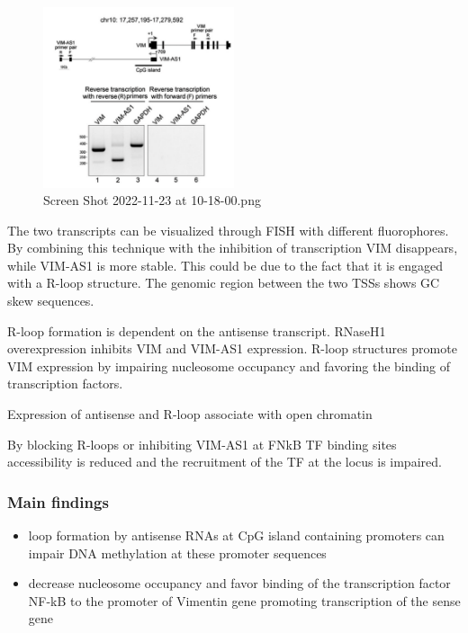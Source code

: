\begin{figure}
\centering
\includegraphics[width=0.5\textwidth]{../_resources/Screen_Shot_2022-11-23_at_10-18-00.png}
\caption{Screen Shot 2022-11-23 at 10-18-00.png}
\end{figure}

The two transcripts can be visualized through FISH with different fluorophores. By combining this technique with the inhibition of transcription VIM disappears, while VIM-AS1 is more stable. This could be due to the fact that it is engaged with a R-loop structure. The genomic region between the two TSSs shows GC skew sequences.

R-loop formation is dependent on the antisense transcript. RNaseH1 overexpression inhibits VIM and VIM-AS1 expression. R-loop structures promote VIM expression by impairing nucleosome occupancy and favoring the binding of transcription factors.

Expression of antisense and R-loop associate with open chromatin

By blocking R-loops or inhibiting VIM-AS1 at FNkB TF binding sites accessibility is reduced and the recruitment of the TF at the locus is impaired.

\hypertarget{main-findings}{%
\subsubsection{Main findings}\label{main-findings}}

\begin{itemize}
\tightlist
\item
  loop formation by antisense RNAs at CpG island containing promoters can impair DNA methylation at these promoter sequences
\item
  decrease nucleosome occupancy and favor binding of the transcription factor NF-kB to the promoter of Vimentin gene promoting transcription of the sense gene
\end{itemize}

